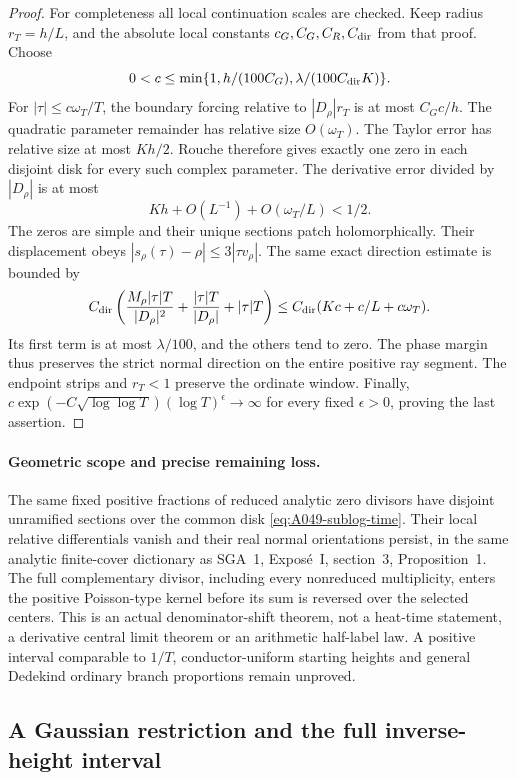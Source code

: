 \begin{proof}
For completeness all local continuation scales are checked.
Keep radius \(r_T=h/L\), and the absolute local constants
\(c_G,C_G,C_R,C_{\rm dir}\) from that proof. Choose
\[
 0<c\le\min\{1,h/(100C_G),
                           \lambda/(100C_{\rm dir}K)\}.
\]
For \(|\tau|\le c\omega_T/T\), the boundary forcing
relative to \(|D_\rho|r_T\) is at most \(C_Gc/h\).
The quadratic parameter remainder has relative size
\(O(\omega_T)\). The Taylor error has relative size
at most \(Kh/2\). Rouche therefore gives exactly one
zero in each disjoint disk for every such complex parameter.
The derivative error divided by \(|D_\rho|\) is at most
\[
                    Kh+O(L^{-1})+O(\omega_T/L)<1/2.
\]
The zeros are simple and their unique sections patch
holomorphically. Their displacement obeys
\(|s_\rho(\tau)-\rho|\le3|\tau v_\rho|\).
The same exact direction estimate is bounded by
\[
 C_{\rm dir}\left(
       \frac{M_\rho|\tau|T}{|D_\rho|^2}
             +\frac{|\tau|T}{|D_\rho|}+|\tau|T\right)
             \le C_{\rm dir}(Kc+c/L+c\omega_T).
\]
Its first term is at most \(\lambda/100\), and the
others tend to zero. The phase margin thus preserves
the strict normal direction on the entire positive ray
segment. The endpoint strips and \(r_T<1\) preserve the
ordinate window. Finally,
\(c\exp(-C\sqrt{\log\log T})(\log T)^\epsilon\to\infty\)
for every fixed \(\epsilon>0\), proving the last assertion.
\end{proof}

\paragraph{Geometric scope and precise remaining loss.}
The same fixed positive fractions of reduced analytic
zero divisors have disjoint unramified sections over the
common disk \eqref{eq:A049-sublog-time}. Their local
relative differentials vanish and their real normal
orientations persist, in the same analytic finite-cover
dictionary as SGA~1, Expos\'e~I, section~3, Proposition~1.
The full complementary divisor, including every
nonreduced multiplicity, enters the positive Poisson-type
kernel before its sum is reversed over the selected centers.
This is an actual denominator-shift theorem, not a heat-time
statement, a derivative central limit theorem or an arithmetic
half-label law. A positive interval comparable to \(1/T\),
conductor-uniform starting heights and general Dedekind
ordinary branch proportions remain unproved.


\subsection*{A Gaussian restriction and the full inverse-height interval}

